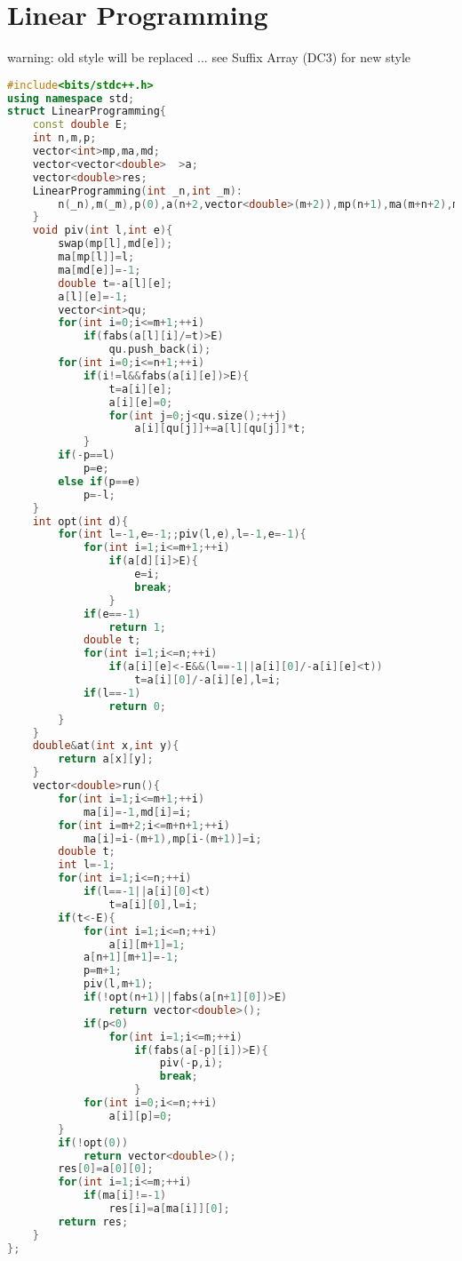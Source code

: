 \documentclass{book}
\begin{document}
\section{Linear Programming}
warning: old style will be replaced ... see Suffix Array (DC3) for new style\begin{lstlisting}[language=C++,title={Linear Programming.hpp (2522 bytes, 89 lines)}]
#include<bits/stdc++.h>
using namespace std;
struct LinearProgramming{
    const double E;
    int n,m,p;
    vector<int>mp,ma,md;
    vector<vector<double>  >a;
    vector<double>res;
    LinearProgramming(int _n,int _m):
        n(_n),m(_m),p(0),a(n+2,vector<double>(m+2)),mp(n+1),ma(m+n+2),md(m+2),res(m+1),E(1e-8){
    }
    void piv(int l,int e){
        swap(mp[l],md[e]);
        ma[mp[l]]=l;
        ma[md[e]]=-1;
        double t=-a[l][e];
        a[l][e]=-1;
        vector<int>qu;
        for(int i=0;i<=m+1;++i)
            if(fabs(a[l][i]/=t)>E)
                qu.push_back(i);
        for(int i=0;i<=n+1;++i)
            if(i!=l&&fabs(a[i][e])>E){
                t=a[i][e];
                a[i][e]=0;
                for(int j=0;j<qu.size();++j)
                    a[i][qu[j]]+=a[l][qu[j]]*t;
            }
        if(-p==l)
            p=e;
        else if(p==e)
            p=-l;
    }
    int opt(int d){
        for(int l=-1,e=-1;;piv(l,e),l=-1,e=-1){
            for(int i=1;i<=m+1;++i)
                if(a[d][i]>E){
                    e=i;
                    break;
                }
            if(e==-1)
                return 1;
            double t;
            for(int i=1;i<=n;++i)
                if(a[i][e]<-E&&(l==-1||a[i][0]/-a[i][e]<t))
                    t=a[i][0]/-a[i][e],l=i;
            if(l==-1)
                return 0;
        }
    }
    double&at(int x,int y){
        return a[x][y];
    }
    vector<double>run(){
        for(int i=1;i<=m+1;++i)
            ma[i]=-1,md[i]=i;
        for(int i=m+2;i<=m+n+1;++i)
            ma[i]=i-(m+1),mp[i-(m+1)]=i;
        double t;
        int l=-1;
        for(int i=1;i<=n;++i)
            if(l==-1||a[i][0]<t)
                t=a[i][0],l=i;
        if(t<-E){
            for(int i=1;i<=n;++i)
                a[i][m+1]=1;
            a[n+1][m+1]=-1;
            p=m+1;
            piv(l,m+1);
            if(!opt(n+1)||fabs(a[n+1][0])>E)
                return vector<double>();
            if(p<0)
                for(int i=1;i<=m;++i)
                    if(fabs(a[-p][i])>E){
                        piv(-p,i);
                        break;
                    }
            for(int i=0;i<=n;++i)
                a[i][p]=0;
        }
        if(!opt(0))
            return vector<double>();
        res[0]=a[0][0];
        for(int i=1;i<=m;++i)
            if(ma[i]!=-1)
                res[i]=a[ma[i]][0];
        return res;
    }
};
\end{lstlisting}
\end{document}
